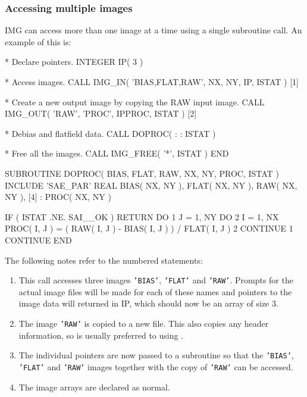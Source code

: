 \documentclass[twoside,11pt,nolof]{starlink}
\providecommand{\myverb}[1]{{\texttt{#1}}}
\providecommand{\mynote}{The following notes refer to the numbered statements:}
\newenvironment{code}{\begin{small}}
                     {\end{small}}
\newenvironment{enumnotes}
{
   \renewcommand{\labelenumi}{\myverb{[\theenumi]}}
   \begin{enumerate}
}{
   \end{enumerate}
   \renewcommand{\labelenumi}{\theenumi}
}
\begin{document}
\subsubsection{Accessing multiple images}
IMG can access more than one image at a time using a single subroutine
call. An example of this is:
\begin{code}
\begin{terminalv}

*  Declare pointers.
      INTEGER IP( 3 )

*  Access images.
      CALL IMG_IN( 'BIAS,FLAT,RAW', NX, NY, IP, ISTAT )       [1]

*  Create a new output image by copying the RAW input image.
      CALL IMG_OUT( 'RAW', 'PROC', IPPROC, ISTAT )            [2]

*  Debias and flatfield data.
      CALL DOPROC( %
     :             %
     :             ISTAT )

*  Free all the images.
      CALL IMG_FREE( '*', ISTAT )
      END

      SUBROUTINE DOPROC( BIAS, FLAT, RAW, NX, NY, PROC, ISTAT )
      INCLUDE 'SAE_PAR'
      REAL BIAS( NX, NY ), FLAT( NX, NY ), RAW( NX, NY ),     [4]
     :     PROC( NX, NY )

      IF ( ISTAT .NE. SAI__OK ) RETURN
      DO 1 J = 1, NY
         DO 2 I = 1, NX
            PROC( I, J ) = ( RAW( I, J ) - BIAS( I, J ) ) / FLAT( I, J )
 2       CONTINUE
 1    CONTINUE
      END
\end{terminalv}
\end{code}
\mynote
\begin{enumnotes}
\item
This call accesses three images \myverb{'BIAS'}, \myverb{'FLAT'} and
\myverb{'RAW'}. Prompts for the actual image files will be made for
each of these names and pointers to the image data will returned in IP,
which should now be an array of size 3.

\item
The image \myverb{'RAW'} is copied to a new file. This also copies any
header information, so is usually preferred to using \htmlref{\myverb{IMG\_NEW}}{IMG_NEW[n][x]}.

\item
The individual pointers are now passed to a subroutine so that the
\myverb{'BIAS'}, \myverb{'FLAT'} and \myverb{'RAW'} images together
with the copy of \myverb{'RAW'} can be accessed.

\item
The image arrays are declared as normal.
\end{enumnotes}
\end{document}

